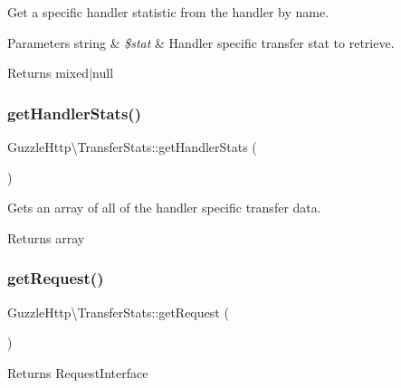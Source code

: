Get a specific handler statistic from the handler by name.


\begin{DoxyParams}[1]{Parameters}
string & {\em \$stat} & Handler specific transfer stat to retrieve.\\
\hline
\end{DoxyParams}
\begin{DoxyReturn}{Returns}
mixed$\vert$null 
\end{DoxyReturn}
\mbox{\label{classGuzzleHttp_1_1TransferStats_a9ea5b0da85d20cab4ca13efa036495d2}} 
\subsubsection{\texorpdfstring{get\+Handler\+Stats()}{getHandlerStats()}}
{\footnotesize\ttfamily Guzzle\+Http\textbackslash{}\+Transfer\+Stats\+::get\+Handler\+Stats (\begin{DoxyParamCaption}{ }\end{DoxyParamCaption})}

Gets an array of all of the handler specific transfer data.

\begin{DoxyReturn}{Returns}
array 
\end{DoxyReturn}
\mbox{\label{classGuzzleHttp_1_1TransferStats_a85d61fa677319c2f8ee452028c159640}} 
\subsubsection{\texorpdfstring{get\+Request()}{getRequest()}}
{\footnotesize\ttfamily Guzzle\+Http\textbackslash{}\+Transfer\+Stats\+::get\+Request (\begin{DoxyParamCaption}{ }\end{DoxyParamCaption})}

\begin{DoxyReturn}{Returns}
Request\+Interface 
\end{DoxyReturn}
\mbox{\label{classGuzzleHttp_1_1TransferStats_a24d462d8c7f1c626b4b0897947ce2acc}} 

